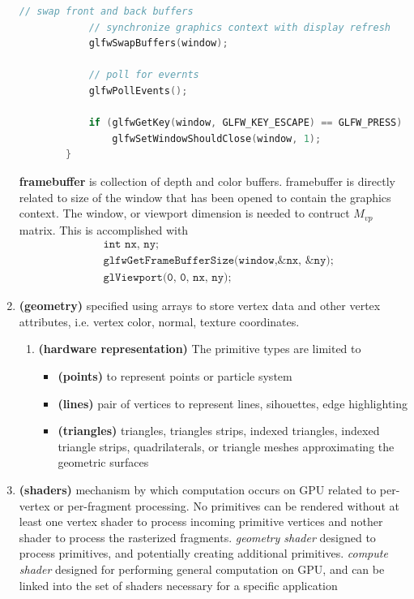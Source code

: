 \documentclass[11pt]{article}
\newcommand{\bheading}[1]{\textbf{(#1)}}
\begin{document}
\begin{enumerate}
\begin{lstlisting}[frame=single, language=c++]
            // swap front and back buffers
            // synchronize graphics context with display refresh
            glfwSwapBuffers(window);

            // poll for evernts
            glfwPollEvents();

            if (glfwGetKey(window, GLFW_KEY_ESCAPE) == GLFW_PRESS)
                glfwSetWindowShouldClose(window, 1);
        }
    \end{lstlisting}
    \textbf{framebuffer} is collection of depth and color buffers. framebuffer is directly related to size of the window that has been opened to contain the graphics context. The window, or viewport dimension is needed to contruct $M_{vp}$ matrix. This is accomplished with
    \begin{align*}
        &\texttt{int nx, ny;} \\
        &\texttt{glfwGetFrameBufferSize(window,\&nx, \&ny);} \\
        &\texttt{glViewport(0, 0, nx, ny);}
    \end{align*}
    \item \bheading{geometry} specified using arrays to store vertex data and other vertex attributes, i.e. vertex color, normal, texture coordinates. 
    \begin{enumerate}
        \item \bheading{hardware representation} The primitive types are limited to
        \begin{itemize}
            \item \bheading{points} to represent points or particle system
            \item \bheading{lines} pair of vertices to represent lines, sihouettes, edge highlighting
            \item \bheading{triangles} triangles, triangles strips, indexed triangles, indexed triangle strips, quadrilaterals, or triangle meshes approximating the geometric surfaces
        \end{itemize}
    \end{enumerate}
    \item \bheading{shaders} mechanism by which computation occurs on GPU related to per-vertex or per-fragment processing. No primitives can be rendered without at least one vertex shader to process incoming primitive vertices and nother shader to process the rasterized fragments. \textit{geometry shader} designed to process primitives, and potentially creating additional primitives. \textit{compute shader} designed for performing general computation on GPU, and can be linked into the set of shaders necessary for a specific application

\end{enumerate}
\end{document}
